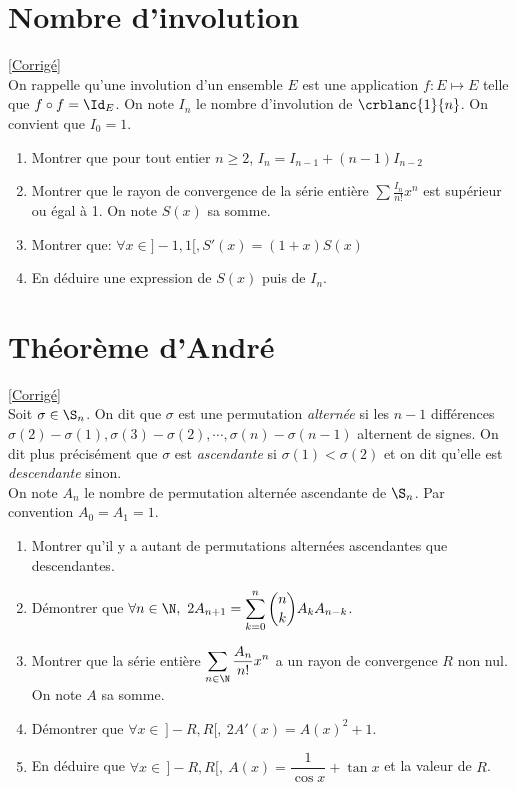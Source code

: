 \documentclass{book}
\begin{document}
\section{Nombre d'involution}
\label{Nombre d'involution}
\textcolor{blue}{\hyperref[sec:nombre-dinvolution]{[Corrigé]}}\\
On rappelle qu'une involution d'un ensemble $E$ est une application $f:E \mapsto E$ telle que $f\circ f=\Id_E$. On note $I_n$ le nombre d'involution de $\crblanc{1}{n}$. On convient que $I_0=1$.
\begin{enumerate}[leftmargin=*]
	\item Montrer que pour tout entier $n\geq 2$, $I_n=I_{n-1}+(n-1)I_{n-2}$
	\item Montrer que le rayon de convergence de la série entière $\displaystyle\sum \frac{I_n}{n!}x^n$ est supérieur ou égal à 1. On note $S(x)$ sa somme.
	\item Montrer que: $\forall x\in]-1,1[, S'(x)=(1+x)S(x)$
	\item En déduire une expression de $S(x)$ puis de $I_n$.
\end{enumerate}

\section{Théorème d'André}
\label{Théorème d'André}
\textcolor{blue}{\hyperref[Théorème d'André corrigé]{[Corrigé]}}\\
Soit $\sigma\in \S_n$. On dit que $\sigma$ est une permutation \textit{alternée} si les $n-1$ différences $\sigma(2)-\sigma(1),\sigma(3)-\sigma(2),\cdots,\sigma(n)-\sigma(n-1)$ alternent de signes. On dit plus précisément que $\sigma$ est \textit{ascendante} si $\sigma(1)<\sigma(2)$ et on dit qu'elle est \textit{descendante} sinon.\\
On note $A_n$ le nombre de permutation alternée ascendante de $\S_n$. Par convention $A_0=A_1=1$.
\begin{enumerate}
	\item Montrer qu'il y a autant de permutations alternées ascendantes que descendantes.
	\item Démontrer que $\forall n\in \N,\ 2A_{n+1}=\displaystyle\sum_{k=0}^n\binom{n}{k}A_kA_{n-k}$.
	\item Montrer que la série entière $\displaystyle\sum_{n\in \N}\frac{A_n}{n!}x^n$ a un rayon de convergence $R$ non nul. On note $A$ sa somme.
	\item Démontrer que $\forall x\in\,]-R,R[,\ 2A'(x)=A(x)^2+1$.
	\item En déduire que $\forall x\in\, ]-R,R[,\ A(x)=\dfrac{1}{\cos x}+\tan x$ et la valeur de $R$.
\end{enumerate}
\end{document}

